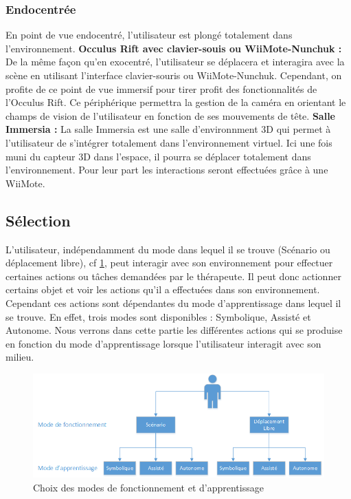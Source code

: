\subsubsection{Endocentrée}
En point de vue endocentré, l’utilisateur est plongé totalement dans l’environnement.
\newline
\textbf{Occulus Rift avec clavier-souis ou WiiMote-Nunchuk : }
De la même façon qu’en exocentré, l’utilisateur se déplacera et interagira avec la scène en utilisant l’interface clavier-souris ou WiiMote-Nunchuk. Cependant, on profite de ce point de vue immersif pour tirer profit des fonctionnalités de l’Occulus Rift.
Ce périphérique permettra la gestion de la caméra en orientant le champs de vision de l’utilisateur en fonction de ses mouvements de tête.
\newline
\textbf{Salle Immersia : }
La salle Immersia est une salle d’environnment 3D qui permet à l’utilisateur de s’intégrer totalement dans l’environnement virtuel. Ici une fois muni du capteur 3D dans l'espace, il pourra se déplacer totalement dans l’environnement.
Pour leur part les interactions seront effectuées grâce à une WiiMote.

\subsection{Sélection}

L'utilisateur, indépendamment du mode dans lequel il se trouve (Scénario ou déplacement libre), cf \ref{fig:modes}, peut interagir avec son environnement pour effectuer certaines actions ou tâches demandées par le thérapeute. Il peut donc actionner certains objet et voir les actions qu'il a effectuées dans son environnement. Cependant ces actions sont dépendantes du mode d'apprentissage dans lequel il se trouve. En effet, trois modes sont disponibles : Symbolique, Assisté et Autonome. Nous verrons dans cette partie les différentes actions qui se produise en fonction du mode d'apprentissage lorsque l'utilisateur interagit avec son milieu.

\begin{figure}[h]
  \centering
  \includegraphics[width=1\textwidth]{2-Specifications/img-utilisateur/modes.png}
  \caption{\label{fig:modes} Choix des modes de fonctionnement et d'apprentissage}
\end{figure}


